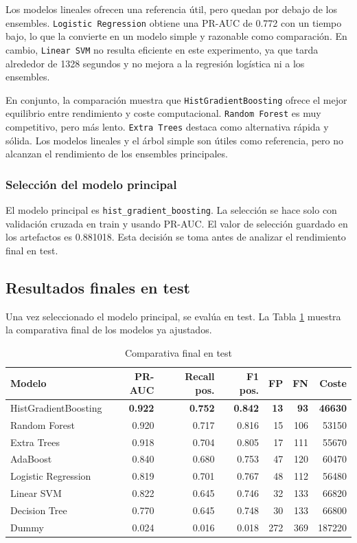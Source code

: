 \documentclass[11pt,a4paper]{article}
\begin{document}
Los modelos lineales ofrecen una referencia útil, pero quedan por debajo de los ensembles. \texttt{Logistic Regression} obtiene una PR-AUC de 0.772 con un tiempo bajo, lo que la convierte en un modelo simple y razonable como comparación. En cambio, \texttt{Linear SVM} no resulta eficiente en este experimento, ya que tarda alrededor de 1328 segundos y no mejora a la regresión logística ni a los ensembles.

En conjunto, la comparación muestra que \texttt{HistGradientBoosting} ofrece el mejor equilibrio entre rendimiento y coste computacional. \texttt{Random Forest} es muy competitivo, pero más lento. \texttt{Extra Trees} destaca como alternativa rápida y sólida. Los modelos lineales y el árbol simple son útiles como referencia, pero no alcanzan el rendimiento de los ensembles principales.

\subsubsection{Selección del modelo principal}

El modelo principal es \texttt{hist\_gradient\_boosting}. La selección se hace solo con validación cruzada en train y usando PR-AUC. El valor de selección guardado en los artefactos es 0.881018. Esta decisión se toma antes de analizar el rendimiento final en test.

\subsection{Resultados finales en test}
\label{sec_test}

Una vez seleccionado el modelo principal, se evalúa en test. La Tabla \ref{tab_test} muestra la comparativa final de los modelos ya ajustados.

\begin{table}[H]
\centering
\caption{Comparativa final en test}
\label{tab_test}
\small
\begin{tabular}{@{}lrrrrrr@{}}
\toprule
\textbf{Modelo} & \textbf{PR-AUC} & \textbf{Recall pos.} & \textbf{F1 pos.} & \textbf{FP} & \textbf{FN} & \textbf{Coste}\\
\midrule
\rowcolor{bestrow} HistGradientBoosting & \textbf{0.922} & \textbf{0.752} & \textbf{0.842} & \textbf{13} & \textbf{93} & \textbf{46630}\\
Random Forest & 0.920 & 0.717 & 0.816 & 15 & 106 & 53150\\
Extra Trees & 0.918 & 0.704 & 0.805 & 17 & 111 & 55670\\
AdaBoost & 0.840 & 0.680 & 0.753 & 47 & 120 & 60470\\
Logistic Regression & 0.819 & 0.701 & 0.767 & 48 & 112 & 56480\\
Linear SVM & 0.822 & 0.645 & 0.746 & 32 & 133 & 66820\\
Decision Tree & 0.770 & 0.645 & 0.748 & 30 & 133 & 66800\\
Dummy & 0.024 & 0.016 & 0.018 & 272 & 369 & 187220\\
\bottomrule
\end{tabular}
\end{table}
\end{document}
